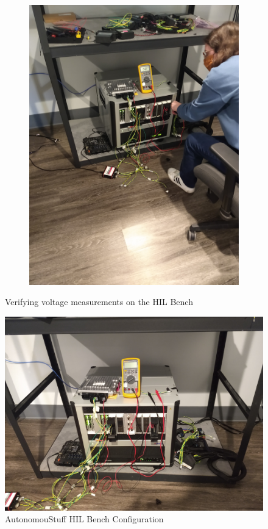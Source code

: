 \documentclass[journal,twoside,web]{ieeecolor}
\begin{document}
\begin{figure}
\begin{subfigure}[b]{0.48\linewidth}
    		\includegraphics[angle=270,width=0.9\linewidth]{figs/img/picturesVisitToAStuff/hilMeasurementHannah}
    		\caption{}
    \end{subfigure}
    \caption{Verifying voltage measurements on the HIL Bench}
    \label{fig:hilMeasuring}
\end{figure}

\begin{figure}
	\centering
	\includegraphics[width=0.95\linewidth]{figs/img/picturesVisitToAStuff/hilBenchAstuff}
	\caption{AutonomouStuff HIL Bench Configuration}
	\label{fig:hilBench}
\end{figure}
\end{document}
